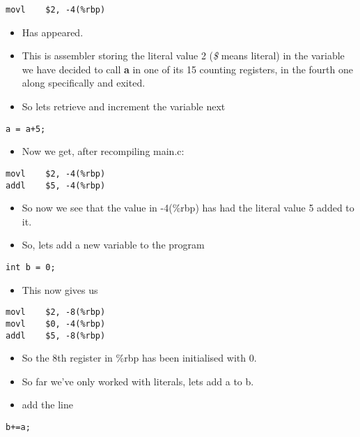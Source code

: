 \documentclass[minimal, t]{article}
\begin{document}
\begin{verbatim}
movl    $2, -4(%rbp)
\end{verbatim}
\begin{itemize}
\item Has appeared.
\item This is assembler storing the literal value 2 (\emph{\$} means
literal) in the variable we have decided to call \textbf{a} in one of its
15 counting registers, in the fourth one along specifically and
exited.

\item So lets retrieve and increment the variable next
\end{itemize}
\begin{verbatim}
a = a+5;
\end{verbatim}
\begin{itemize}
\item Now we get, after recompiling main.c:
\end{itemize}
\begin{verbatim}
movl    $2, -4(%rbp)
addl    $5, -4(%rbp)
\end{verbatim}
\begin{itemize}
\item So now we see that the value in -4(\%rbp) has had the literal value 5
added to it.
\item So, lets add a new variable to the program
\end{itemize}

\begin{verbatim}
int b = 0;
\end{verbatim}
\begin{itemize}
\item This now gives us
\end{itemize}

\begin{verbatim}
movl    $2, -8(%rbp)
movl    $0, -4(%rbp)
addl    $5, -8(%rbp)
\end{verbatim}
\begin{itemize}
\item So the 8th register in \%rbp has been initialised with 0.

\item So far we've only worked with literals, lets add a to b.
\item add the line
\end{itemize}
\begin{verbatim}
b+=a;
\end{verbatim}
\end{document}
